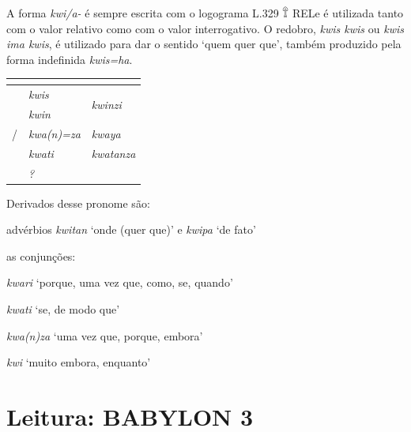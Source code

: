 A forma \emph{kwi\slash{}a-} é sempre escrita com o logograma L.329 𔕰 REL\@ e
é utilizada tanto com o valor relativo como com o valor interrogativo.
O redobro, \emph{kwis kwis} ou \emph{kwis ima kwis}, é utilizado para dar o
sentido `quem quer que', também produzido pela forma indefinida \emph{kwis=ha}.

\begin{center}
	\begin{tabular}[c]{lll}
		\toprule
		                 & \Sg{}\emph{}       & \Pl{}\emph{}                     \\
		\midrule
		\Nom{} \Com{}    & \emph{kwis}        & \multirow{2}{4em}{\emph{kwinzi}} \\
		\Acu{} \Com{}    & \emph{kwin}        &                                  \\
		\Nom/\Acu\Neut{} & \emph{kwa{(n)}=za} & \emph{kwaya}                     \\
		\Dat{}           & \emph{kwati}       & \emph{kwatanza}                  \\
		\Abl{}           & \emph{?}           & \emph{}                          \\
		\bottomrule
	\end{tabular}
\end{center}

\noindent Derivados desse pronome são:
\begin{compactitem}
	\item advérbios \emph{kwitan} `onde (quer que)' e \emph{kwipa} `de fato'
	\item as conjunções:
	\begin{compactitem}
		\item \emph{kwari} `porque, uma vez que, como, se, quando'
		\item \emph{kwati} `se, de modo que'
		\item \emph{kwa{(n)}za} `uma vez que, porque, embora'
		\item \emph{kwi} `muito embora, enquanto'
	\end{compactitem}
\end{compactitem}



\section{Leitura: BABYLON 3}

